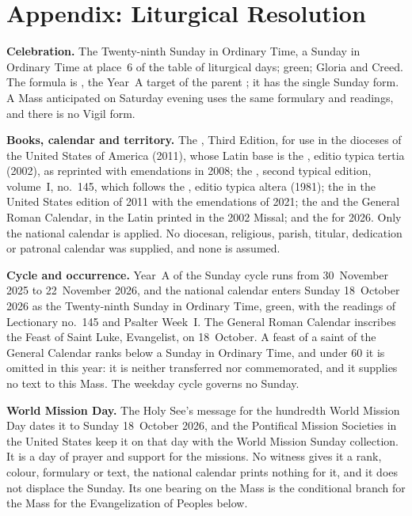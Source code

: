 \clearpage
\section{Appendix: Liturgical Resolution}
\label{sec:liturgical-resolution}

{\small
\textbf{Celebration.} The Twenty-ninth Sunday in Ordinary Time, a Sunday in
Ordinary Time at place~6 of the table of liturgical days; green; Gloria and
Creed. The formula is , the Year~A target of the parent
; it has the single Sunday form. A Mass anticipated on Saturday
evening uses the same formulary and readings, and there is no Vigil form.

\textbf{Books, calendar and territory.} The , Third
Edition, for use in the dioceses of the United States of America (2011), whose
Latin base is the , editio typica tertia (2002), as
reprinted with emendations in 2008; the , second typical edition,
volume~I, no.~145, which follows the , editio
typica altera (1981); the  in the
United States edition of 2011 with the emendations of 2021; the
 and the General
Roman Calendar, in the Latin printed in the 2002 Missal; and the
 for
2026. Only the national calendar is applied. No diocesan, religious, parish,
titular, dedication or patronal calendar was supplied, and none is assumed.

\textbf{Cycle and occurrence.} Year~A of the Sunday cycle runs from
30~November 2025 to 22~November 2026, and the national calendar enters Sunday
18~October 2026 as the Twenty-ninth Sunday in Ordinary Time, green, with the
readings of Lectionary no.~145 and Psalter Week~I. The General Roman Calendar
inscribes the Feast of Saint Luke, Evangelist, on 18~October. A feast of a
saint of the General Calendar ranks below a Sunday in Ordinary Time, and under
 60 it is omitted in this year: it is neither
transferred nor commemorated, and it supplies no text to this Mass. The weekday
cycle governs no Sunday.

\textbf{World Mission Day.} The Holy See's message for the hundredth World
Mission Day dates it to Sunday 18~October 2026, and the Pontifical Mission
Societies in the United States keep it on that day with the World Mission
Sunday collection. It is a day of prayer and support for the missions. No
witness gives it a rank, colour, formulary or text, the national calendar
prints nothing for it, and it does not displace the Sunday. Its one bearing on
the Mass is the conditional branch for the Mass for the Evangelization of
Peoples below.

}
